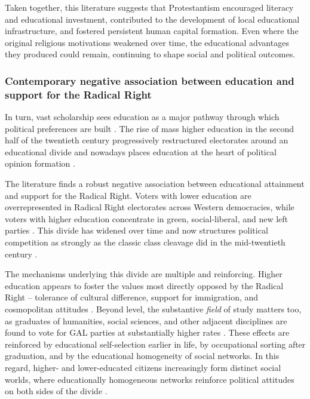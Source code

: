 \documentclass[12pt]{article}
\begin{document}
Taken together, this literature suggests that Protestantism encouraged literacy and educational investment, contributed to the development of local educational infrastructure, and fostered persistent human capital formation. Even where the original religious motivations weakened over time, the educational advantages they produced could remain, continuing to shape social and political outcomes.

\subsubsection{Contemporary negative association between education and support for the Radical Right}

In turn, vast scholarship sees education as a major pathway through which political preferences are built \parencite{abou-chadiBrahminLeftMerchant2021, gethin2022brahmin, kitschelt2023polarity, hooghe2025field, schafer2026education}. The rise of mass higher education in the second half of the twentieth century progressively restructured electorates around an educational divide and nowadays places education at the heart of political opinion formation \parencite{stubager2008education, stubager2009education, zollinger2026updating, l2026educational}. 

The literature finds a robust negative association between educational attainment and support for the Radical Right. Voters with lower education are overrepresented in Radical Right electorates across Western democracies, while voters with higher education concentrate in green, social-liberal, and new left parties \parencite{ivarsflaten2012voting, oesch2018electoral, abou-chadiBrahminLeftMerchant2021}. This divide has widened over time and now structures political competition as strongly as the classic class cleavage did in the mid-twentieth century \parencite{hooghe2026does}.

The mechanisms underlying this divide are multiple and reinforcing. Higher education appears to foster the values most directly opposed by the Radical Right -- tolerance of cultural difference, support for immigration, and cosmopolitan attitudes \parencite[see, for example,][]{cavaille2019education, stubager2008education}. Beyond level, the substantive \textit{field} of study matters too, as graduates of humanities, social sciences, and other adjacent disciplines are found to vote for GAL parties at substantially higher rates \parencite{hooghe2025field}. These effects are reinforced by educational self-selection earlier in life, by occupational sorting after graduation, and by the educational homogeneity of social networks. In this regard, higher- and lower-educated citizens increasingly form distinct social worlds, where educationally homogeneous networks reinforce political attitudes on both sides of the divide \parencite{de2025separated, schafer2026education}.
\end{document}
